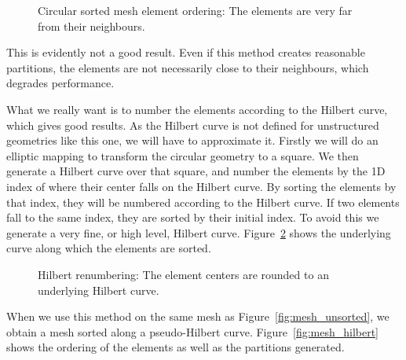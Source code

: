 \begin{figure}[H]
	\centering
	
	\caption{Circular sorted mesh element ordering: The elements are very far from their neighbours.}\label{fig:mesh_circular_ordering}
\end{figure}

This is evidently not a good result. Even if this method creates reasonable partitions, the elements
are not necessarily close to their neighbours, which degrades performance.

What we really want is to number the elements according to the Hilbert curve, which gives good
results. As the Hilbert curve is not defined for unstructured geometries like this one, we will have
to approximate it. Firstly we will do an elliptic mapping to transform the circular geometry to a
square. We then generate a Hilbert curve over that square, and number the elements by the 1D index
of where their center falls on the Hilbert curve. By sorting the elements by that index, they will
be numbered according to the Hilbert curve. If two elements fall to the same index, they are sorted
by their initial index. To avoid this we generate a very fine, or high level, Hilbert curve.
Figure~\ref{fig:hilbert_renumbering} shows the underlying curve along which the elements are sorted.

\begin{figure}[H]
	\centering
	
	\caption{Hilbert renumbering: The element centers are rounded to an underlying Hilbert curve.}\label{fig:hilbert_renumbering}
\end{figure}

When we use this method on the same mesh as Figure~\ref{fig:mesh_unsorted}, we obtain a mesh sorted
along a pseudo-Hilbert curve. Figure~\ref{fig:mesh_hilbert} shows the ordering of the elements as
well as the partitions generated.

